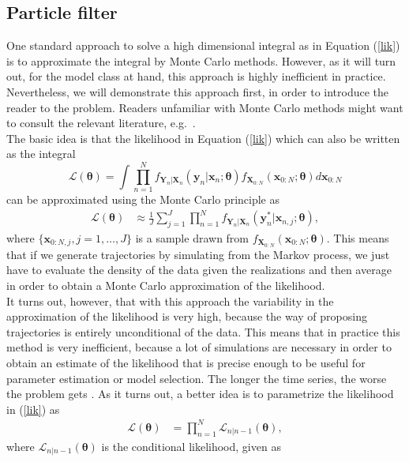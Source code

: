  \subsection{Particle filter}
One standard approach to solve a high dimensional integral  as in Equation (\ref{lik}) is  to approximate the integral by Monte Carlo methods. However, as it will turn out, for the model class at hand, this approach is highly inefficient in  practice. Nevertheless, we will demonstrate this approach first, in order to introduce the reader to the problem.  Readers unfamiliar with  Monte Carlo methods might want to consult the relevant literature, e.g.\ \cite{Robert2004, pfilter}. \\
The basic idea is that the likelihood in Equation (\ref{lik}) which can also be written as the integral 
\begin{equation}
\mathcal{L}(\bm{\theta})=\int 
 \prod_{n=1}^{N}f_{\bm{Y}_n|\bm{X}_{n}}(\bm{y}_n|\bm{x}_{n};\bm{\theta})f_{\bm{X}_{0:N}}(\bm{x}_{0:N};\bm{\theta})d\bm{x}_{0:N}
\end{equation}
can be approximated using the Monte Carlo principle as
\begin{align*}
\mathcal{L}(\bm{\theta})&\approx \frac{1}{J}\sum_{j=1}^{J}\prod_{n=1}^{N}f_{\bm{Y}_n|\bm{X}_{n}}(\bm{y}^*_{n}|\bm{x}_{n,j};\bm{\theta}),
\end{align*}
where $\{\bm{x}_{0:N,j},j=1,\dots ,J\}$ is a sample drawn from $f_{\bm{X}_{0:N}}(\bm{x}_{0:N};\bm{\theta})$.
This means that if we  generate trajectories by simulating from the Markov process, we just have to evaluate the density of the data given the realizations and then average in order to  obtain a Monte Carlo approximation of the likelihood.\\
It turns out, however, that with this approach the  variability in the approximation of the  likelihood is very high, because the way of  proposing trajectories is entirely unconditional of the data. This means that in practice this method is very inefficient, because a lot of simulations are necessary in order to obtain an estimate of the likelihood that is precise enough to be useful for parameter estimation or model selection. The longer the time series, the worse the problem gets \citep{King2017}. As it turns out, a better idea is to parametrize the likelihood in (\ref{lik})  as 
 \begin{align}
\mathcal{L}(\bm{\theta})&=\prod_{n=1}^N \mathcal{L}_{n|n-1}(\bm{\theta}),
\end{align}
where $\mathcal{L}_{n|n-1}(\bm{\theta})$ is the conditional likelihood, given as 
